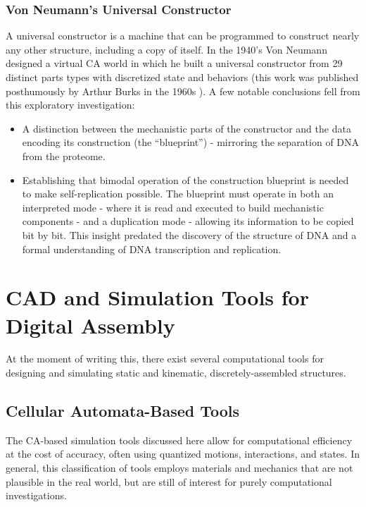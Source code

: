 {\subsubsection{Von Neumann's Universal Constructor}

A universal constructor is a machine that can be programmed to construct nearly any other structure, including a copy of itself.  In the 1940's Von Neumann designed a virtual CA world in which he built a universal constructor from 29 distinct parts types with discretized state and behaviors (this work was published posthumously by Arthur Burks in the 1960s \cite{Burks1969}).  A few notable conclusions fell from this exploratory investigation:\\

\begin{itemize}
\item{A distinction between the mechanistic parts of the constructor and the data encoding its construction (the ``blueprint'') - mirroring the separation of DNA from the proteome.}
\item{Establishing that bimodal operation of the construction blueprint is needed to make self-replication possible.  The blueprint must operate in both an interpreted mode - where it is read and executed to build mechanistic components - and a duplication mode - allowing its information to be copied bit by bit.  This insight predated the discovery of the structure of DNA and a formal understanding of DNA transcription and replication.}
\end{itemize}

\section{CAD and Simulation Tools for Digital Assembly}

At the moment of writing this, there exist several computational tools for designing and simulating static and kinematic, discretely-assembled structures.

\subsection{Cellular Automata-Based Tools}

The CA-based simulation tools discussed here allow for computational efficiency at the cost of accuracy, often using quantized motions, interactions, and states.  In general, this classification of tools employs materials and mechanics that are not plausible in the real world, but are still of interest for purely computational investigations.\\

}
